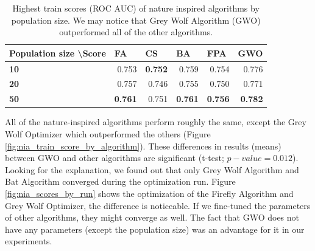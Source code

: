 \documentclass[runningheads]{llncs}
\begin{document}
\begin{table}[]
	\begin{center}
		\begin{tabular}{|l|rrrrr|}
			\hline
			\textbf{Population size \textbackslash Score} & \multicolumn{1}{l}{\textbf{FA}} & \multicolumn{1}{l}{\textbf{CS}} & \multicolumn{1}{l}{\textbf{BA}} & \multicolumn{1}{l}{\textbf{FPA}} & \multicolumn{1}{l|}{\textbf{GWO}} \\ \hline
			\textbf{10}                                             & 0.753                           & \textbf{0.752}                           & 0.759                           & 0.754                            & 0.776                             \\
			\textbf{20}                                             & 0.757                           & 0.746                           & 0.755                           & 0.750                            & 0.771                             \\
			\textbf{50}                                             & \textbf{0.761}                           & 0.751                           & \textbf{0.761}                           & \textbf{0.756}                            & \textbf{0.782}                             \\ \hline
		\end{tabular}
	\end{center}
	\begin{center}
		\caption{Highest train scores (ROC AUC) of nature inspired algorithms by population size. We may notice that Grey Wolf Algorithm (GWO) outperformed all of the other algorithms.} \label{tab:nia_comparison}
	\end{center}
\end{table}

All of the nature-inspired algorithms perform roughly the same, except the Grey Wolf Optimizer which outperformed the others (Figure \ref{fig:nia_train_score_by_algorithm}). These differences in results (means) between GWO and other algorithms are significant (t-test; $p-value=0.012$). Looking for the explanation, we found out that only Grey Wolf Algorithm and Bat Algorithm converged during the optimization run. Figure \ref{fig:nia_scores_by_run} shows the optimization of the Firefly Algorithm and Grey Wolf Optimizer, the difference is noticeable. If we fine-tuned the parameters of other algorithms, they might converge as well. The fact that GWO does not have any parameters (except the population size) was an advantage for it in our experiments.
\end{document}
